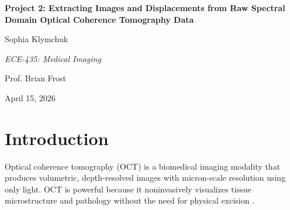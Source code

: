 \documentclass[10pt]{article}
\begin{document}
  \begin{center}
    {\LARGE \textbf{Project 2: Extracting Images and Displacements from Raw Spectral Domain Optical Coherence Tomography Data} \par}
    \vspace{0.4cm}
    
    {\Large Sophia Klymchuk \par}
    \vspace{0.2cm}
    
    {\large \textit{ECE-435: Medical Imaging} \par}
    {\large Prof. Brian Frost \par}
    \vspace{0.4cm}
    
    {\large April 15, 2026 \par}
    \vspace{0.8cm} %
  \end{center}


\begin{abstract}
This report details the reconstruction and analysis of raw spectral-domain optical coherence tomography (SD-OCT) data acquired on a ThorLabs Telesto~3 system. A complete A-scan processing pipeline is developed, comprising background subtraction, wavelength-to-wavenumber resampling, Hanning windowing, polynomial deconvolution, and Fourier transformation. The pipeline is applied to a B-scan dataset of a stacked Scotch tape sample, from which ten individual tape layers are resolved and their thicknesses estimated. Sub-pixel vibrometry is performed on two M-scan datasets via spectral domain phase microscopy (SDPM), enabling nanometer-scale displacement measurements of a speaker membrane driven at 80~dB SPL. A single tone at $8.011$~kHz is identified from the single-tone M-scan, while all 40 constituent frequencies of a complex tone stimulus are recovered from the 40-tone M-scan. Amplitude analysis indicates that the speaker's frequency response is non-uniform across the measured range, though no harmonic distortion is observed, consistent with approximately linear behavior.
\end{abstract}

\section{Introduction}
Optical coherence tomography (OCT) is a biomedical imaging modality that produces volumetric, depth-resolved images with micron-scale resolution using only light. OCT is powerful because it noninvasively visualizes tissue microstructure and pathology without the need for physical excision \cite{fujimotoIntroductionOCT2015}.
\end{document}
